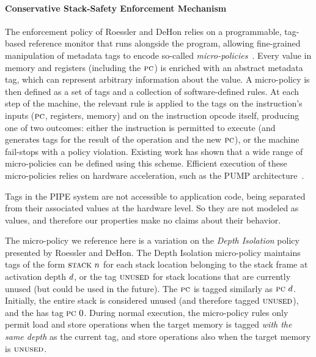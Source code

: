 \documentclass[10pt,conference]{ieeetran}%
\theoremstyle{definition}
\begin{document}
{\paragraph*{Conservative Stack-Safety Enforcement Mechanism}
%
The enforcement policy of Roessler and DeHon \cite{DBLP:conf/sp/RoesslerD18} relies
on a programmable, tag-based reference monitor that runs alongside the
program,
allowing fine-grained manipulation of metadata tags to encode so-called
\emph{micro-policies}~\cite{pump_oakland2015}.
Every value in
memory and registers (including the $\textsc{pc}$)
is enriched with an abstract metadata tag, which can represent
arbitrary information about the value. A micro-policy is then defined as a
set of tags and a
collection of software-defined rules.
At each step of the machine, the relevant rule is applied to the tags on
the instruction's inputs ($\textsc{pc}$, registers, memory) and on the
instruction opcode itself, producing
one of two outcomes: either the instruction is permitted to execute (and
generates tags for the result of the operation and the new $\textsc{pc}$), or
the machine fail-stops with a policy violation.
Existing work \cite{TestingNI:ICFP,pump_oakland2015, DBLP:conf/sp/RoesslerD18}
has shown that a wide range of
micro-policies can be defined using this scheme.
Efficient execution of these micro-policies relies on hardware acceleration,
such as the PUMP architecture~\cite{pump:asplos2015}.

Tags in the PIPE system are not accessible to application code, being separated
from their associated values at the hardware level. So they are not modeled
as values, and therefore our properties make no claims about
their behavior.

The micro-policy we reference here is a variation
on the {\em Depth Isolation} policy presented by
Roessler and DeHon\cite{DBLP:conf/sp/RoesslerD18}.
The Depth Isolation micro-policy maintains tags of the form $\textsc{stack} ~ n$ for
each stack location belonging to the stack frame at activation depth
$d$, or the tag $\textsc{unused}$ for stack locations that are currently
unused (but could be used in the future).
%
The $\textsc{pc}$ is tagged similarly as $\textsc{pc} ~ d$.
%
Initially, the entire stack is considered unused (and therefore tagged
$\textsc{unused}$), and the {\PCname} has tag $\textsc{pc} ~ 0$.
%
During normal execution, the micro-policy rules only permit load and
store operations when the target memory is tagged {\em with the same
 depth} as the current {\PCname} tag, and store operations also when the
target memory is $\textsc{unused}$.

}
\end{document}
